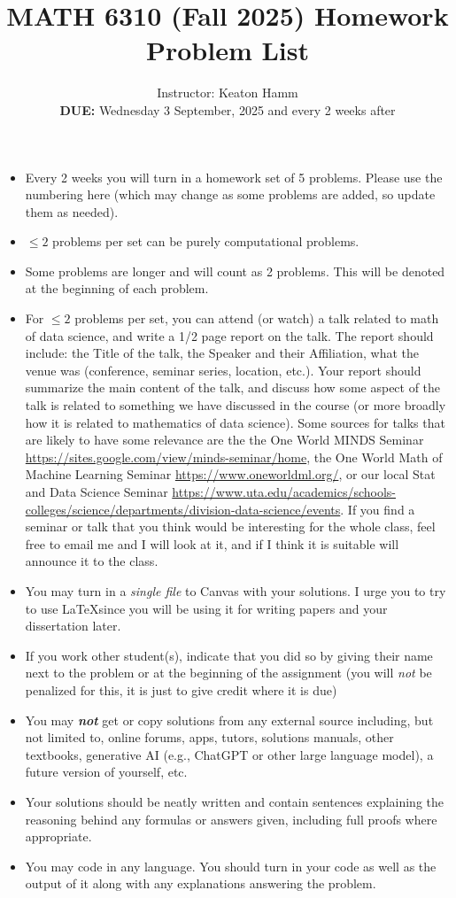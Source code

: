 \documentclass{amsart}[11pt]
\title{MATH 6310 (Fall 2025) Homework Problem List}
\author{Instructor: Keaton Hamm\\\textbf{DUE:} Wednesday  3 September, 2025 and every 2 weeks after}
\theoremstyle{definition}
\begin{document}
\maketitle

\begin{itemize}
\item Every 2 weeks you will turn in a homework set of 5 problems. Please use the numbering here (which may change as some problems are added, so update them as needed).
\item $\leq 2$ problems per set can be purely computational problems.
\item Some problems are longer and will count as 2 problems. This will be denoted at the beginning of each problem.
\item For $\leq 2$ problems per set, you can attend (or watch) a talk related to math of data science, and write a 1/2 page report on the talk. The report should include: the Title of the talk, the Speaker and their Affiliation, what the venue was (conference, seminar series, location, etc.). Your report should summarize the main content of the talk, and discuss how some aspect of the talk is related to something we have discussed in the course (or more broadly how it is related to mathematics of data science). Some sources for talks that are likely to have some relevance are the the One World MINDS Seminar \url{https://sites.google.com/view/minds-seminar/home}, the One World Math of Machine Learning Seminar \url{https://www.oneworldml.org/},  or our local Stat and Data Science Seminar \url{https://www.uta.edu/academics/schools-colleges/science/departments/division-data-science/events}.  If you find a seminar or talk that you think would be interesting for the whole class, feel free to email me and I will look at it, and if I think it is suitable will announce it to the class.
\item You may turn in a \textit{single file} to Canvas with your solutions.  I urge you to try to use \LaTeX since you will be using it for writing papers and your dissertation later. 
\item If you work other student(s), indicate that you did so by giving their name next to the problem or at the beginning of the assignment (you will \textit{not} be penalized for this, it is just to give credit where it is due)
\item You may \textit{\textbf{not}} get or copy solutions from any external source including, but not limited to, online forums, apps, tutors, solutions manuals, other textbooks, generative AI (e.g., ChatGPT or other large language model), a future version of yourself, etc.
\item Your solutions should be neatly written and contain sentences explaining the reasoning behind any formulas or answers given, including full proofs where appropriate.
\item You may code in any language. You should turn in your code as well as the output of it along with any explanations answering the problem.
\end{itemize}
\end{document}
